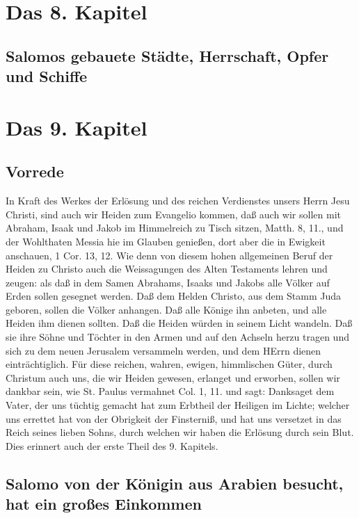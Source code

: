 \chapter{Das 8. Kapitel}

\section[Salomos gebauete Städte, Herrschaft, Opfer und Schiffe]{Salomos gebauete Städte, Herrschaft, Opfer und Schiffe}

\chapter{Das 9. Kapitel}

\section{Vorrede}

In Kraft des Werkes der Erlösung und des reichen Verdienstes unsers Herrn Jesu Christi, sind auch wir Heiden zum Evangelio kommen, daß auch wir sollen mit Abraham, Isaak und Jakob im Himmelreich zu Tisch sitzen, Matth. 8, 11., und der Wohlthaten Messia hie im Glauben genießen, dort aber die in Ewigkeit anschauen, 1 Cor. 13, 12. Wie denn von diesem hohen allgemeinen Beruf der Heiden zu Christo auch die Weissagungen des Alten Testaments lehren und zeugen: als daß in dem Samen Abrahams, Isaaks und Jakobs alle Völker auf Erden sollen gesegnet werden. Daß dem Helden Christo, aus dem Stamm Juda geboren, sollen die Völker anhangen. Daß alle Könige ihn anbeten, und alle Heiden ihm dienen sollten. Daß die Heiden würden in seinem Licht wandeln. Daß sie ihre Söhne und Töchter in den Armen und auf den Achseln herzu tragen und sich zu dem neuen Jerusalem versammeln werden, und dem HErrn dienen einträchtiglich. Für diese reichen, wahren, ewigen, himmlischen Güter, durch Christum auch uns, die wir Heiden gewesen, erlanget und erworben, sollen wir dankbar sein, wie St. Paulus vermahnet Col. 1, 11. und sagt: Danksaget dem Vater, der uns tüchtig gemacht hat zum Erbtheil der Heiligen im Lichte; welcher uns errettet hat von der Obrigkeit der Finsterniß, und hat uns versetzet in das Reich seines lieben Sohns, durch welchen wir haben die Erlösung durch sein Blut. Dies erinnert auch der erste Theil des 9. Kapitels.

\section[Salomo von der Königin aus Arabien besucht, hat]{Salomo von der Königin aus Arabien besucht, hat ein großes Einkommen}

